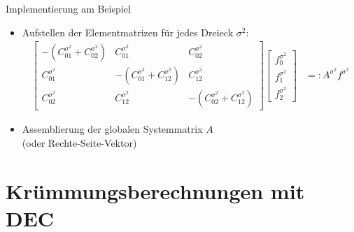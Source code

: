 \documentclass{beamer}
\begin{document}
  \begin{frame}
    \begin{block}{Implementierung am Beispiel}
      \begin{itemize}
        \item<1-> Aufstellen der Elementmatrizen für jedes Dreieck \( \sigma^{2} \):
          {\small
          \begin{align*}
            \begin{bmatrix}
        -\left( C^{\sigma^{2}}_{01} + C^{\sigma^{2}}_{02}\right) & C^{\sigma^{2}}_{01} & C^{\sigma^{2}}_{02} \\
        C^{\sigma^{2}}_{01} & -\left( C^{\sigma^{2}}_{01} + C^{\sigma^{2}}_{12}\right) & C^{\sigma^{2}}_{12} \\
        C^{\sigma^{2}}_{02} & C^{\sigma^{2}}_{12} & -\left( C^{\sigma^{2}}_{02} + C^{\sigma^{2}}_{12}\right)
      \end{bmatrix}
      \begin{bmatrix}
        f^{\sigma^{2}}_{0} \\ f^{\sigma^{2}}_{1} \\ f^{\sigma^{2}}_{2}
      \end{bmatrix}
        &=: A^{\sigma^{2}} f^{\sigma^{2}}
          \end{align*}}
        \item<2-> Assemblierung der globalen Systemmatrix \( A \) \\(oder Rechte-Seite-Vektor)
      \end{itemize}
    \end{block}
  \end{frame}


\section{Krümmungsberechnungen mit DEC}
  
\end{document}
